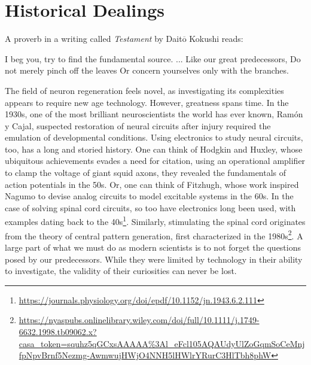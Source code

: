 \documentclass[12pt]{report}
\begin{document}
\section{Historical Dealings}

\label{sec:HistoricalDealings}

A proverb in a writing called \textit{Testament} by Dait$\overline{\mathrm{o}}$ Kokushi reads:\newline

\hspace*{1cm} I beg you, try to find the fundamental source.\newline
\hspace*{1cm} ...\newline
\hspace*{1cm} Like our great predecessors,\newline 
\hspace*{1cm} Do not merely pinch off the leaves\newline
\hspace*{1cm} Or concern yourselves only with the branches.\newline 

The field of neuron regeneration feels novel, as investigating its complexities appears to require new age technology. However, greatness spans time. In the 1930s, one of the most brilliant neuroscientists the world has ever known, Ramón y Cajal, suspected restoration of neural circuits after injury required the emulation of developmental conditions. Using electronics to study neural circuits, too, has a long and storied history. One can think of Hodgkin and Huxley, whose ubiquitous achievements evades a need for citation, using an operational amplifier to clamp the voltage of giant squid axons, they revealed the fundamentals of action potentials in the 50s. Or, one can think of Fitzhugh, whose work inspired Nagumo to devise analog circuits to model excitable systems in the 60s. In the case of solving spinal cord circuits, so too have electronics long been used, with examples dating back to the 40s\footnote{\url{https://journals.physiology.org/doi/epdf/10.1152/jn.1943.6.2.111}}. Similarly, stimulating the spinal cord originates from the theory of central pattern generation, first characterized in the 1980s\footnote{\url{https://nyaspubs.onlinelibrary.wiley.com/doi/full/10.1111/j.1749-6632.1998.tb09062.x?casa_token=squhz5qGCxsAAAAA\%3Al_eFcl105AQAUdyUlZoGqmSoCeMnjfpNpvBrnf5Nezmg-AwmwujHWjO4NNH5lHWlrYRurC3HlTbh8phW}}. A large part of what we must do as modern scientists is to not forget the questions posed by our predecessors. While they were limited by technology in their ability to investigate, the validity of their curiosities can never be lost.\newline
\end{document}
